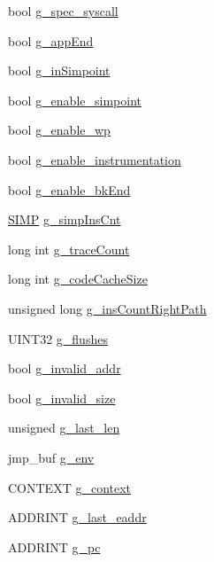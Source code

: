 \begin{DoxyCompactItemize}
bool \hyperlink{structg__variable_a2527496ce273ca32855343e8401fb4f8}{g\_\-spec\_\-syscall}
\item 
bool \hyperlink{structg__variable_ac0ace8e752b855d8a33cd9c9a5d62511}{g\_\-appEnd}
\item 
bool \hyperlink{structg__variable_a1bfe24cfc139671202d50d3617bc3095}{g\_\-inSimpoint}
\item 
bool \hyperlink{structg__variable_a1e6b96906fa24ada5ee9e969e65adb86}{g\_\-enable\_\-simpoint}
\item 
bool \hyperlink{structg__variable_a77b6c2a82a2eb4c8216123f75080ec16}{g\_\-enable\_\-wp}
\item 
bool \hyperlink{structg__variable_a24cc6242b0cf003080328df4b4e3ddca}{g\_\-enable\_\-instrumentation}
\item 
bool \hyperlink{structg__variable_a5e3f674b76f6bccf4c537dda6184a9be}{g\_\-enable\_\-bkEnd}
\item 
\hyperlink{global_2global_8h_aa6308256cfa38997c75a56309db4fd1e}{SIMP} \hyperlink{structg__variable_a05056b9147b20e4beee1dbdacaced249}{g\_\-simpInsCnt}
\item 
long int \hyperlink{structg__variable_ad00b3634585f9cc7e89adb907114a290}{g\_\-traceCount}
\item 
long int \hyperlink{structg__variable_aa65753112ddcc38c6ecea36b807a9a38}{g\_\-codeCacheSize}
\item 
unsigned long \hyperlink{structg__variable_a9849ae320434c4f9d060f131e24509fd}{g\_\-insCountRightPath}
\item 
UINT32 \hyperlink{structg__variable_aee7d9a2652e4ea63755601664d7f2a00}{g\_\-flushes}
\item 
bool \hyperlink{structg__variable_a259dcd1135795c605246fdbae100601f}{g\_\-invalid\_\-addr}
\item 
bool \hyperlink{structg__variable_a5256c1a4113a6054f2a8e07a108faaf5}{g\_\-invalid\_\-size}
\item 
unsigned \hyperlink{structg__variable_a310b38dcf23edbd0a80618cbb9fc9e55}{g\_\-last\_\-len}
\item 
jmp\_\-buf \hyperlink{structg__variable_ae22303265d64707d4e5c29a9fc9bae70}{g\_\-env}
\item 
CONTEXT \hyperlink{structg__variable_a5b23f6047c40d03de740f5d82416307d}{g\_\-context}
\item 
ADDRINT \hyperlink{structg__variable_a35c782efa4c2f2d4dc350ec814e77018}{g\_\-last\_\-eaddr}
\item 
ADDRINT \hyperlink{structg__variable_abb0cb377249c922c2132cd5bbabb0509}{g\_\-pc}

\end{DoxyCompactItemize}
